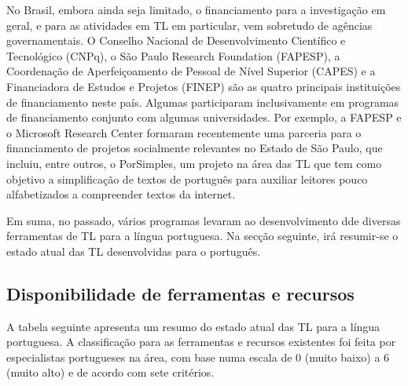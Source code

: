 \documentclass[]{../metanetpaper}
\begin{document}
\begin{multicols}{2}
No Brasil, embora ainda seja limitado, o financiamento para a investigação em geral, e para as atividades em TL em particular, vem sobretudo de agências governamentais. O Conselho Nacional de Desenvolvimento Científico e Tecnológico (CNPq), o São Paulo Research Foundation (FAPESP), a Coordenação de Aperfeiçoamento de Pessoal de Nível Superior (CAPES) e a Financiadora de Estudos e Projetos (FINEP) são as quatro principais instituições de financiamento neste país. Algumas participaram inclusivamente em programas de financiamento conjunto com algumas universidades. Por exemplo, a FAPESP e o Microsoft Research Center formaram recentemente uma parceria para o financiamento de projetos socialmente relevantes no Estado de São Paulo, que incluiu, entre outros, o PorSimples\cite{porsimples}, um projeto na área das TL que tem como objetivo a simplificação de textos de português para auxiliar leitores pouco alfabetizados a compreender textos da internet.

Em suma, no passado, vários programas levaram ao desenvolvimento dde diversas ferramentas de TL para a língua portuguesa. Na secção seguinte, irá resumir-se o estado atual das TL desenvolvidas para o português.

\subsection{Disponibilidade de ferramentas e recursos}

 A tabela seguinte apresenta um resumo do estado atual das TL para a língua portuguesa. A classificação para as ferramentas e recursos existentes foi feita por especialistas portugueses na área, com base numa escala de 0 (muito baixo) a 6 (muito alto) e de acordo com sete critérios.


\end{multicols}
\end{document}
